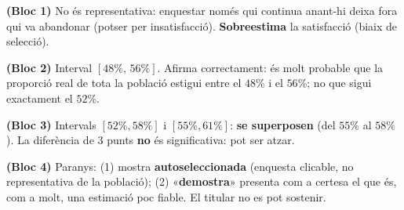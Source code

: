 \begin{solucions}
\begin{sollist}
  \item \textbf{(Bloc 1)} No és representativa: enquestar només qui continua anant-hi deixa
        fora qui va abandonar (potser per insatisfacció). \textbf{Sobreestima} la
        satisfacció (biaix de selecció).
  \item \textbf{(Bloc 2)} Interval $[48\%,\,56\%]$. Afirma correctament: és molt probable
        que la proporció real de tota la població estigui entre el $48\%$ i el $56\%$; no
        que sigui exactament el $52\%$.
  \item \textbf{(Bloc 3)} Intervals $[52\%,58\%]$ i $[55\%,61\%]$: \textbf{se superposen}
        (del $55\%$ al $58\%$). La diferència de $3$ punts \textbf{no} és significativa: pot
        ser atzar.
  \item \textbf{(Bloc 4)} Paranys: (1) mostra \textbf{autoseleccionada} (enquesta clicable,
        no representativa de la població); (2) «\textbf{demostra}» presenta com a certesa el
        que és, com a molt, una estimació poc fiable. El titular no es pot sostenir.
\end{sollist}
\end{solucions}
